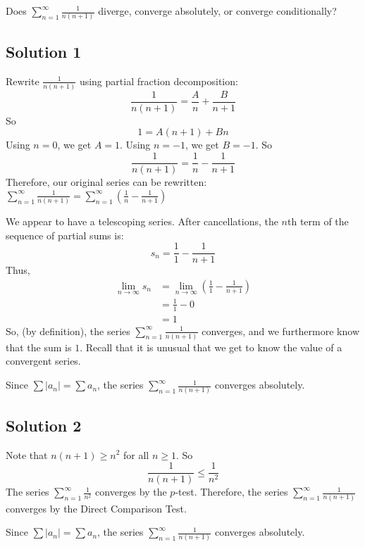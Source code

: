 \documentclass{article}
\begin{document}
\noindent
Does $\displaystyle \sum_{n=1}^\infty \frac{1}{n(n+1)}$
diverge, converge absolutely, or converge conditionally?

\subsection*{Solution 1}

Rewrite $\frac1{n(n+1)}$ using partial fraction decomposition:
\[ \frac1{n(n+1)} = \frac{A}{n} + \frac{B}{n+1}\]
So
\[ 1 = A(n+1) + Bn\]
Using $n=0$, we get $A  = 1$. Using $n=-1$, we get $B=-1$. So
\[ \frac1{n(n+1)} = \frac{1}{n} - \frac{1}{n+1}\]
Therefore, our original series can be rewritten:
$\displaystyle \sum_{n=1}^\infty \frac{1}{n(n+1)} =  \displaystyle \sum_{n=1}^\infty \left( \frac{1}{n} - \frac{1}{n+1} \right)$

\vskip20pt
\noindent
We appear to have a telescoping series. After cancellations, the $n$th term of the sequence of partial sums is:
\[ s_n = \frac{1}{1} - \frac{1}{n+1}\]
Thus,
\begin{align*}
\lim_{n \to \infty} s_n
&=  \lim_{n \to \infty} \left( \frac{1}{1} - \frac{1}{n+1}\right) \\
&=  \frac11 - 0\\
&= 1
\end{align*}
So, (by definition), the series $\displaystyle \sum_{n=1}^\infty \frac{1}{n(n+1)}$ converges, and we furthermore know that the sum is $1$. Recall that it is unusual that we get to know the value of a convergent series.

Since $\sum |a_n| = \sum a_n$, the series $\displaystyle \sum_{n=1}^\infty \frac{1}{n(n+1)}$ converges absolutely.

\subsection*{Solution 2}

Note that $n(n+1) \geq n^2$ for all $n \geq 1$. So
\[ \frac1{n(n+1)} \leq \frac{1}{n^2}\]
The series $\displaystyle \sum_{n=1}^\infty  \frac{1}{n^2}$ converges by the $p$-test. Therefore, the series  $\displaystyle \sum_{n=1}^\infty \frac{1}{n(n+1)}$ converges by the Direct Comparison Test.

Since $\sum |a_n| = \sum a_n$, the series $\displaystyle \sum_{n=1}^\infty \frac{1}{n(n+1)}$ converges absolutely.
\end{document}

